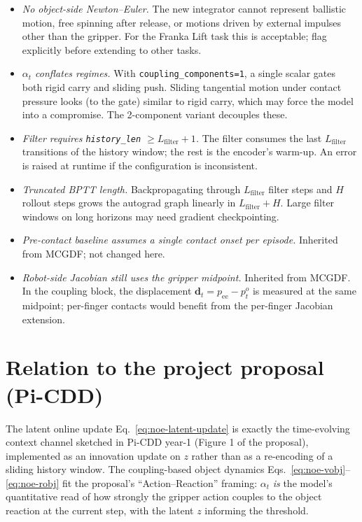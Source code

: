\documentclass[11pt]{article}
\begin{document}
\begin{itemize}
  \item \emph{No object-side Newton--Euler.}  The new integrator
    cannot represent ballistic motion, free spinning after release,
    or motions driven by external impulses other than the gripper.
    For the Franka Lift task this is acceptable; flag explicitly
    before extending to other tasks.
  \item \emph{$\alpha_t$ conflates regimes.}  With
    \texttt{coupling\_components=1}, a single scalar gates both
    rigid carry and sliding push.  Sliding tangential motion under
    contact pressure looks (to the gate) similar to rigid carry,
    which may force the model into a compromise.  The 2-component
    variant decouples these.
  \item \emph{Filter requires
    \texttt{history\_len} $\geq L_{\mathrm{filter}} + 1$.}  The
    filter consumes the last $L_{\mathrm{filter}}$ transitions of
    the history window; the rest is the encoder's warm-up.  An
    error is raised at runtime if the configuration is inconsistent.
  \item \emph{Truncated BPTT length.}  Backpropagating through
    $L_{\mathrm{filter}}$ filter steps and $H$ rollout steps grows
    the autograd graph linearly in $L_{\mathrm{filter}}+H$.  Large
    filter windows on long horizons may need gradient checkpointing.
  \item \emph{Pre-contact baseline assumes a single contact onset
    per episode.}  Inherited from MCGDF; not changed here.
  \item \emph{Robot-side Jacobian still uses the gripper midpoint.}
    Inherited from MCGDF.  In the coupling block, the displacement
    $\mathbf{d}_t = p_{\mathrm{ee}} - p^o_t$ is measured at the
    same midpoint; per-finger contacts would benefit from the
    per-finger Jacobian extension.
\end{itemize}

\section{Relation to the project proposal (Pi-CDD)}

The latent online update Eq.~\eqref{eq:noe-latent-update} is exactly
the time-evolving context channel sketched in Pi-CDD year-1
(Figure 1 of the proposal), implemented as an innovation
update on $z$ rather than as a re-encoding of a sliding history
window.  The coupling-based object dynamics
Eqs.~\eqref{eq:noe-vobj}--\eqref{eq:noe-robj} fit the proposal's
``Action--Reaction'' framing: $\alpha_t$ \emph{is} the model's
quantitative read of how strongly the gripper action couples to the
object reaction at the current step, with the latent $z$ informing
the threshold.
\end{document}
